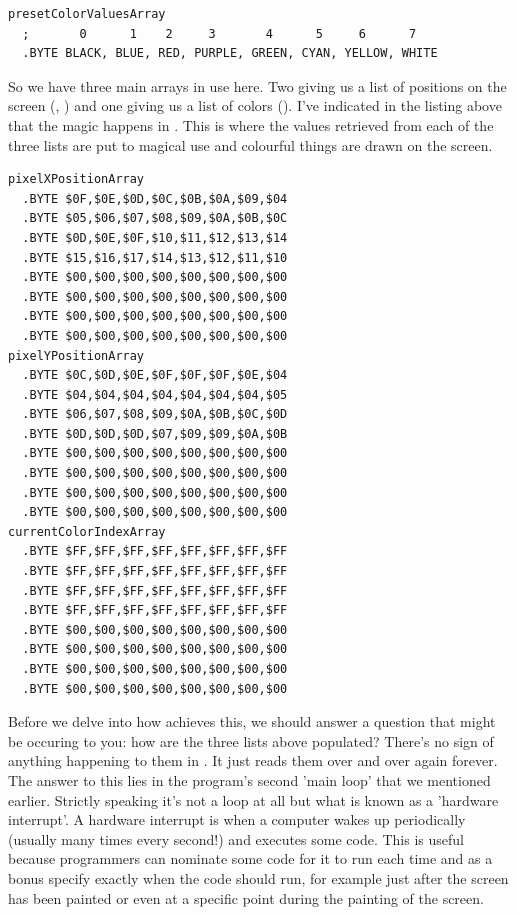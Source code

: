 \begin{lstlisting}
presetColorValuesArray
  ;       0      1    2     3       4      5     6      7
  .BYTE BLACK, BLUE, RED, PURPLE, GREEN, CYAN, YELLOW, WHITE
\end{lstlisting}

So we have three main arrays in use here. Two giving us a list of positions on the screen (, )
and one giving us a list of colors (). I've indicated in the listing above that the magic happens in 
. This is where the values retrieved from each of the three lists are put to magical use and colourful things
are drawn on the screen.

\begin{lstlisting}[caption=The arrays have a larger capacity than is actually used\, each one above is 64 bytes long.]
pixelXPositionArray   
  .BYTE $0F,$0E,$0D,$0C,$0B,$0A,$09,$04
  .BYTE $05,$06,$07,$08,$09,$0A,$0B,$0C
  .BYTE $0D,$0E,$0F,$10,$11,$12,$13,$14
  .BYTE $15,$16,$17,$14,$13,$12,$11,$10
  .BYTE $00,$00,$00,$00,$00,$00,$00,$00
  .BYTE $00,$00,$00,$00,$00,$00,$00,$00
  .BYTE $00,$00,$00,$00,$00,$00,$00,$00
  .BYTE $00,$00,$00,$00,$00,$00,$00,$00
pixelYPositionArray   
  .BYTE $0C,$0D,$0E,$0F,$0F,$0F,$0E,$04
  .BYTE $04,$04,$04,$04,$04,$04,$04,$05
  .BYTE $06,$07,$08,$09,$0A,$0B,$0C,$0D
  .BYTE $0D,$0D,$0D,$07,$09,$09,$0A,$0B
  .BYTE $00,$00,$00,$00,$00,$00,$00,$00
  .BYTE $00,$00,$00,$00,$00,$00,$00,$00
  .BYTE $00,$00,$00,$00,$00,$00,$00,$00
  .BYTE $00,$00,$00,$00,$00,$00,$00,$00
currentColorIndexArray   
  .BYTE $FF,$FF,$FF,$FF,$FF,$FF,$FF,$FF
  .BYTE $FF,$FF,$FF,$FF,$FF,$FF,$FF,$FF
  .BYTE $FF,$FF,$FF,$FF,$FF,$FF,$FF,$FF
  .BYTE $FF,$FF,$FF,$FF,$FF,$FF,$FF,$FF
  .BYTE $00,$00,$00,$00,$00,$00,$00,$00
  .BYTE $00,$00,$00,$00,$00,$00,$00,$00
  .BYTE $00,$00,$00,$00,$00,$00,$00,$00
  .BYTE $00,$00,$00,$00,$00,$00,$00,$00
\end{lstlisting}

Before we delve into how  achieves this, we should answer a question that might be occuring to you: how
are the three lists above populated? There's no sign of anything happening to them in . It just reads them over and
over again forever. The answer to this lies in the program's second 'main loop' that we mentioned earlier. 
Strictly speaking it's not a loop at all but what is known
as a 'hardware interrupt'. A hardware interrupt is when a computer wakes up periodically (usually many times every second!) and executes
some code. This is useful because programmers can nominate some code for it to run each time and as a bonus specify exactly when the code
should run, for example just after the screen has been painted or even at a specific point during the painting of the screen.  

